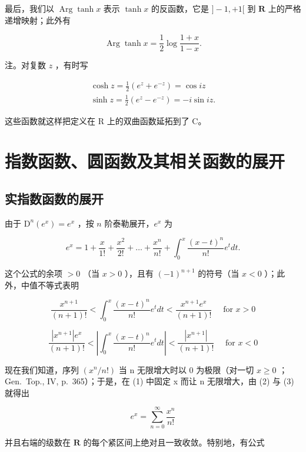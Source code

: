 最后，我们以 \(\operatorname{Arg}\tanh x\) 表示 \(\tanh x\) 的反函数，它是 \(] - 1, +1[\) 到 \(\mathbf{R}\) 上的严格递增映射；此外有

\[
\operatorname{Arg} \tanh x = \frac {1}{2} \log \frac {1 + x}{1 - x}.
\]

注。对复数 \(z\) ，有时写

\[
\begin{array}{l} \cosh z = \frac {1}{2} (e ^ {z} + e ^ {- z}) = \cos i z \\ \sinh z = \frac {1}{2} (e ^ {z} - e ^ {- z}) = - i \sin i z. \end{array}
\]

这些函数就这样把定义在 R 上的双曲函数延拓到了 C。

\section{指数函数、圆函数及其相关函数的展开}

\subsection{实指数函数的展开}

由于 \(\mathrm{D}^n (e^x) = e^x\) ，按 \(n\) 阶泰勒展开，\(e^x\) 为

\[
e ^ {x} = 1 + \frac {x}{1 !} + \frac {x ^ {2}}{2 !} + \dots + \frac {x ^ {n}}{n !} + \int_ {0} ^ {x} \frac {(x - t) ^ {n}}{n !} e ^ {t} d t.\tag{1}
\]

这个公式的余项 \(>0\) （当 \(x > 0\) ），且有 \((-1)^{n + 1}\) 的符号（当 \(x < 0\) ）；此外，中值不等式表明

\[
\frac {x ^ {n + 1}}{(n + 1) !} <   \int_ {0} ^ {x} \frac {(x - t) ^ {n}}{n !} e ^ {t} d t <   \frac {x ^ {n + 1} e ^ {x}}{(n + 1) !} \quad \text { for } x > 0\tag{2}
\]

\[
\frac {\left| x ^ {n + 1} \right| e ^ {x}}{(n + 1) !} <   \left| \int_ {0} ^ {x} \frac {(x - t) ^ {n}}{n !} e ^ {t} d t \right| <   \frac {\left| x ^ {n + 1} \right|}{(n + 1) !} \quad \text { for } x <   0\tag{3}
\]

现在我们知道，序列 \((x^{n}/n!)\) 当 n 无限增大时以 0 为极限（对一切 \(x \geqslant 0\) ；Gen.~Top., IV, p.~365）；于是，在 (1) 中固定 x 而让 n 无限增大，由 (2) 与 (3) 就得出

\[
e ^ {x} = \sum_ {n = 0} ^ {\infty} \frac {x ^ {n}}{n !}\tag{4}
\]

并且右端的级数在 \(\mathbf{R}\) 的每个紧区间上绝对且一致收敛。特别地，有公式

